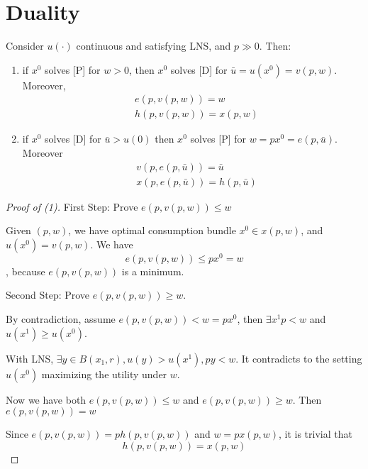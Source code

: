 \section{Duality}

\begin{proposition}
    [Duality]
    Consider $u(\cdot )$ continuous and satisfying LNS, and $p \gg 0$. Then: \begin{enumerate}
        \item if $x^0$ solves [P] for $w > 0$, then $x^0$ solves [D] for $\bar{u} = u(x^0) = v(p,w)$. Moreover, \begin{align*}
                   & e(p,v(p,w)) = w      \\
                   & h(p,v(p,w)) = x(p,w)
              \end{align*}
        \item if $x^0$ solves [D] for $\bar{u} > u(0)$ then $x^0$ solves [P] for $w = px^0 = e(p,\bar{u})$. Moreover \begin{align*}
                   & v(p,e(p,\bar{u})) = \bar{u}      \\
                   & x(p,e(p,\bar{u})) = h(p,\bar{u})
              \end{align*}
    \end{enumerate}
\end{proposition}

\begin{proof}[Proof of (1)]

    First Step: Prove $e(p,v(p,w)) \leq w$

    Given $(p,w)$, we have optimal consumption bundle $x^0 \in x(p,w)$, and $u(x^0) = v(p,w)$. We have \[
        e(p,v(p,w)) \leq px^0 = w
    \], because $e(p,v(p,w))$ is a minimum.

    Second Step: Prove $e(p,v(p,w)) \geq w$.

    By contradiction, assume $e(p,v(p,w)) < w = px^0$, then $\exists x^1 p < w$ and $u(x^1) \geq u(x^0)$.

    With LNS, $\exists y \in  B(x_1, r), u(y) > u(x^1), py < w$. It contradicts to the setting $u(x^0)$ maximizing the utility under $w$.

    Now we have both $e(p,v(p,w)) \leq w$ and $e(p,v(p,w)) \geq w$. Then $e(p,v(p,w)) = w$

    Since $e(p,v(p,w)) = p h(p,v(p,w))$ and $w = p x(p,w)$, it is trivial that \[
        h(p,v(p,w)) = x(p,w)
    \]
\end{proof}


